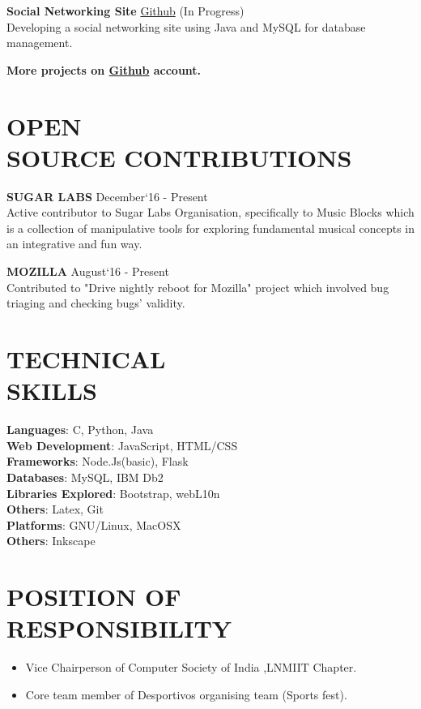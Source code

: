 \documentclass[margin]{res}
\begin{document}
\begin{resume}
  {\textbf{Social Networking Site}} \href{https://github.com/ShubhamSetia/SocialNetworkingSite}{Github} \hfill (In Progress)\\
  Developing a social networking site using Java and MySQL for database management.
  


  \textbf{More projects on \href{https://github.com/Tabs16}{Github} account.}

\section{OPEN \\ SOURCE CONTRIBUTIONS}
	{\textbf{SUGAR LABS}} \hfill December`16 - Present\\
 	Active contributor to Sugar Labs Organisation, specifically to Music Blocks which is a collection of manipulative tools for exploring fundamental musical concepts in an integrative and fun way.

 	{\textbf{MOZILLA}} \hfill August`16 - Present\\
 	Contributed to "Drive nightly reboot for Mozilla" project which involved bug triaging and checking bugs' validity.
 	




\section{TECHNICAL \\ SKILLS}

  {\textbf{Languages}:} C, Python, Java\\
  {\textbf{Web Development}:} JavaScript, HTML/CSS\\
  {\textbf{Frameworks}:} Node.Js(basic), Flask\\
  {\textbf{Databases}:} MySQL, IBM Db2\\
  {\textbf{Libraries Explored}:} Bootstrap, webL10n\\
  {\textbf{Others}:} Latex, Git\\
  {\textbf{Platforms}:} GNU/Linux, MacOSX\\
  {\textbf{Others}:} Inkscape\\

\section{POSITION OF RESPONSIBILITY }
	\begin{itemize}
		\item Vice Chairperson of Computer Society of India ,LNMIIT Chapter.	
  		\item Core team member of Desportivos organising team (Sports fest).
	\end{itemize}


\end{resume}
\end{document}

